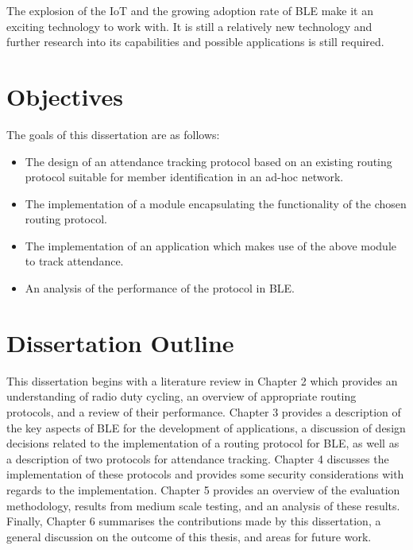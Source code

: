 	The explosion of the IoT and the growing adoption rate of BLE make it an exciting
	technology to work with. It is still a relatively new technology and further
	research into its capabilities and possible applications is still required.

	\section{Objectives}
	The goals of this dissertation are as follows:
	\begin{itemize}
		\item The design of an attendance tracking protocol based on an existing routing
		protocol suitable for member identification in an ad-hoc network.
		\item The implementation of a module encapsulating the functionality of the
		chosen routing protocol.
		\item The implementation of an application which makes use of the above module
		to track attendance.
		\item An analysis of the performance of the protocol in BLE.
	\end{itemize}

	\section{Dissertation Outline}
	This dissertation begins with a literature review in Chapter 2 which provides
	an understanding of radio duty cycling, an overview of appropriate routing
	protocols, and a review of their performance. Chapter 3 provides a description of the key aspects of BLE for the
	development of applications, a discussion of design decisions related to the implementation
	of a routing protocol for BLE, as well as a description of two protocols
	for attendance tracking. Chapter 4 discusses the implementation of these protocols
	and provides some security considerations with regards to the implementation.
	Chapter 5 provides an overview of the evaluation methodology, results from medium
	scale testing, and an analysis of these results. Finally, Chapter 6 summarises the
	contributions made by this dissertation, a general discussion on the outcome of this thesis, and areas
	for future work.
